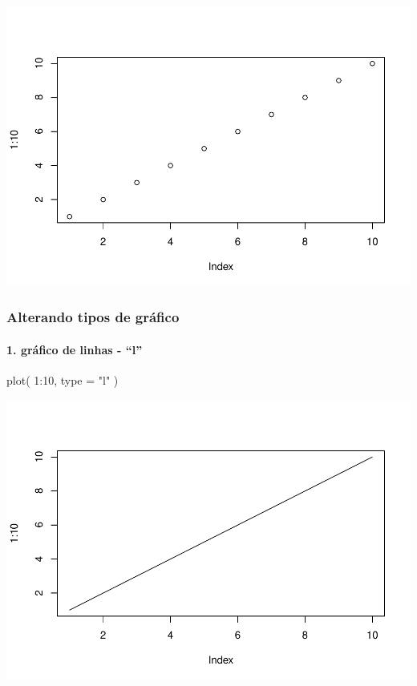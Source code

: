 \documentclass[
]{article}
\newenvironment{Shaded}{\begin{snugshade}}{\end{snugshade}}
\newcommand{\AttributeTok}[1]{\textcolor[rgb]{0.77,0.63,0.00}{#1}}
\newcommand{\DecValTok}[1]{\textcolor[rgb]{0.00,0.00,0.81}{#1}}
\newcommand{\FunctionTok}[1]{\textcolor[rgb]{0.00,0.00,0.00}{#1}}
\newcommand{\NormalTok}[1]{#1}
\newcommand{\SpecialCharTok}[1]{\textcolor[rgb]{0.00,0.00,0.00}{#1}}
\newcommand{\StringTok}[1]{\textcolor[rgb]{0.31,0.60,0.02}{#1}}
\begin{document}
\includegraphics{presencial_função_plot_04_turma_B_files/figure-latex/unnamed-chunk-1-2.pdf}

\hypertarget{alterando-tipos-de-gruxe1fico}{%
\subsubsection{Alterando tipos de
gráfico}\label{alterando-tipos-de-gruxe1fico}}

\hypertarget{gruxe1fico-de-linhas---l}{%
\paragraph{1. gráfico de linhas -
``l''}\label{gruxe1fico-de-linhas---l}}

\begin{Shaded}
\begin{Highlighting}[]
\FunctionTok{plot}\NormalTok{( }\DecValTok{1}\SpecialCharTok{:}\DecValTok{10}\NormalTok{, }\AttributeTok{type =} \StringTok{"l"}\NormalTok{ )}
\end{Highlighting}
\end{Shaded}

\includegraphics{presencial_função_plot_04_turma_B_files/figure-latex/unnamed-chunk-2-1.pdf}
\end{document}
